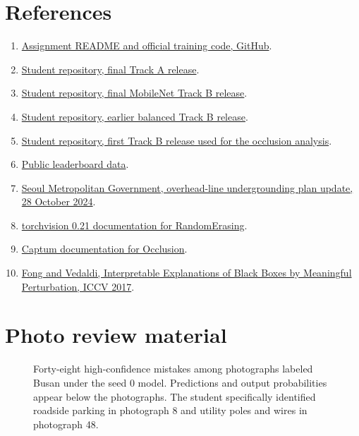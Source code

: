 \documentclass[11pt]{article}
\begin{document}
\section*{References}
\begin{enumerate}\footnotesize
\item \href{https://github.com/jdasam/mas1004-assignment2}{Assignment README and official training code, GitHub}.
\item \href{https://github.com/jellykeeng/mas1004-assignment2/releases/tag/track-a-2}{Student repository, final Track A release}.
\item \href{https://github.com/jellykeeng/mas1004-assignment2/releases/tag/track-b-3}{Student repository, final MobileNet Track B release}.
\item \href{https://github.com/jellykeeng/mas1004-assignment2/releases/tag/track-b-2}{Student repository, earlier balanced Track B release}.
\item \href{https://github.com/jellykeeng/mas1004-assignment2/releases/tag/track-b-1}{Student repository, first Track B release used for the occlusion analysis}.
\item \href{https://jdasam.github.io/mas1004-leaderboard/board.json}{Public leaderboard data}.
\item \href{https://news.seoul.go.kr/safe/archives/515090}{Seoul Metropolitan Government, overhead-line undergrounding plan update, 28 October 2024}.
\item \href{https://docs.pytorch.org/vision/0.21/generated/torchvision.transforms.RandomErasing.html}{torchvision 0.21 documentation for RandomErasing}.
\item \href{https://captum.ai/api/occlusion.html}{Captum documentation for Occlusion}.
\item \href{https://robots.ox.ac.uk/~vedaldi/assets/pubs/fong17interpretable.pdf}{Fong and Vedaldi, Interpretable Explanations of Black Boxes by Meaningful Perturbation, ICCV 2017}.
\end{enumerate}

\clearpage
\appendix
\section{Photo review material}

\begin{figure}[htbp]
\centering
{}
\caption{Forty-eight high-confidence mistakes among photographs labeled Busan
under the seed 0 model. Predictions and output probabilities appear below
the photographs. The student specifically identified roadside parking in
photograph 8 and utility poles and wires in photograph 48.}
\end{figure}
\end{document}
